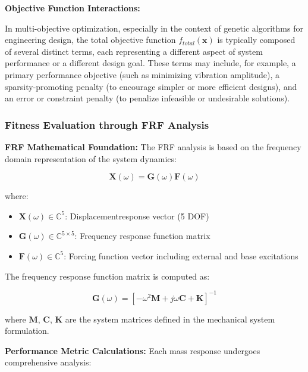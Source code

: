 \documentclass[12pt,a4paper]{article}
\begin{document}
\textbf{Objective Function Interactions:} 

In multi-objective optimization, especially in the context of genetic algorithms for engineering design, the total objective function $f_{total}(\mathbf{x})$ is typically composed of several distinct terms, each representing a different aspect of system performance or a different design goal. These terms may include, for example, a primary performance objective (such as minimizing vibration amplitude), a sparsity-promoting penalty (to encourage simpler or more efficient designs), and an error or constraint penalty (to penalize infeasible or undesirable solutions).


\subsubsection{Fitness Evaluation through FRF Analysis}


\textbf{FRF Mathematical Foundation:} The FRF analysis is based on the frequency domain representation of the system dynamics:

\begin{equation}\label{Eq.frequency_domain_system_detailed}
\mathbf{X}(\omega) = \mathbf{G}(\omega) \mathbf{F}(\omega)
\end{equation}

where:
\begin{itemize}
    \item $\mathbf{X}(\omega) \in \mathbb{C}^{5}$: Displacementresponse vector (5 DOF)
    \item $\mathbf{G}(\omega) \in \mathbb{C}^{5 \times 5}$: Frequency response function matrix
    \item $\mathbf{F}(\omega) \in \mathbb{C}^{5}$: Forcing function vector including external and base excitations
\end{itemize}

The frequency response function matrix is computed as:

\begin{equation}\label{Eq.frf_matrix_detailed}
\mathbf{G}(\omega) = \left[ -\omega^2 \mathbf{M} + j\omega \mathbf{C} + \mathbf{K} \right]^{-1}
\end{equation}

where $\mathbf{M}$, $\mathbf{C}$, $\mathbf{K}$ are the system matrices defined in the mechanical system formulation.


\textbf{Performance Metric Calculations:} Each mass response undergoes comprehensive analysis:
\end{document}
